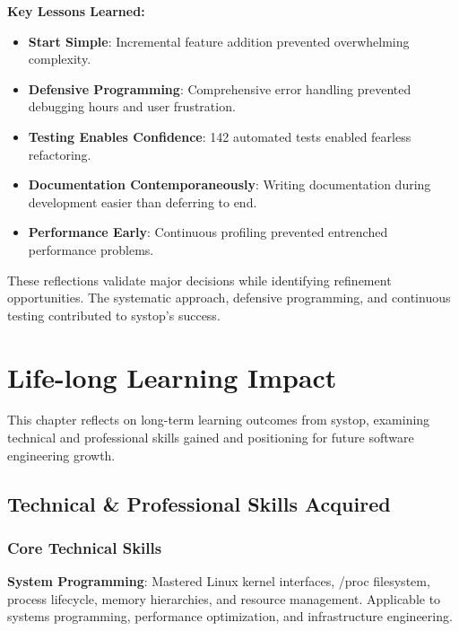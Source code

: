 \documentclass[12pt,a4paper,oneside]{report}
\begin{document}
\textbf{Key Lessons Learned:}
\begin{itemize}
    \item \textbf{Start Simple}: Incremental feature addition prevented overwhelming complexity.
    
    \item \textbf{Defensive Programming}: Comprehensive error handling prevented debugging hours and user frustration.
    
    \item \textbf{Testing Enables Confidence}: 142 automated tests enabled fearless refactoring.
    
    \item \textbf{Documentation Contemporaneously}: Writing documentation during development easier than deferring to end.
    
    \item \textbf{Performance Early}: Continuous profiling prevented entrenched performance problems.
\end{itemize}

These reflections validate major decisions while identifying refinement opportunities. The systematic approach, defensive programming, and continuous testing contributed to systop's success.

\chapter{Life-long Learning Impact}
\label{chap:learning-impact}

This chapter reflects on long-term learning outcomes from systop, examining technical and professional skills gained and positioning for future software engineering growth.

\section{Technical \& Professional Skills Acquired}
\label{sec:skills-acquired}

\subsection{Core Technical Skills}

\textbf{System Programming}: Mastered Linux kernel interfaces, /proc filesystem, process lifecycle, memory hierarchies, and resource management. Applicable to systems programming, performance optimization, and infrastructure engineering.
\end{document}
